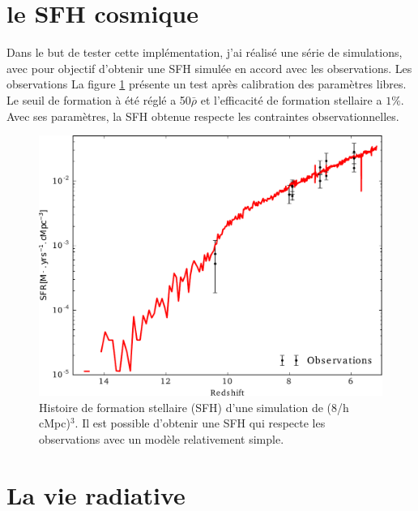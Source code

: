 \section{le SFH cosmique}

Dans le but de tester cette implémentation, j'ai réalisé une série de simulations, avec pour objectif d'obtenir une \ac{SFH} simulée en accord avec les observations.
Les observations 
La figure \ref{fig:test_SFH} présente un test après calibration des paramètres libres.
Le seuil de formation à été réglé a 50$\bar{\rho}$ et l'efficacité de formation stellaire a $1\%$.
Avec ses paramètres, la \ac{SFH} obtenue respecte les contraintes observationnelles.

\begin{figure}
        \includegraphics[width=.95\linewidth]{img/02/SFR.pdf}
        \caption{Histoire de formation stellaire (SFH) d'une simulation de (8/h cMpc)$^3$.
        Il est possible d'obtenir une SFH qui respecte les observations avec un modèle relativement simple.
}
 		\label{fig:test_SFH}
\end{figure}


\clearpage
\section{La vie radiative}

